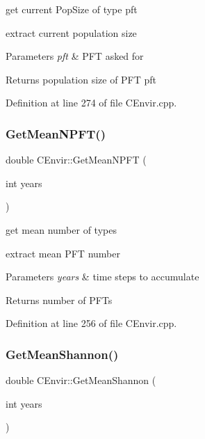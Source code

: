 get current Pop\+Size of type pft 

extract current population size 
\begin{DoxyParams}{Parameters}
{\em pft} & P\+FT asked for \\
\hline
\end{DoxyParams}
\begin{DoxyReturn}{Returns}
population size of P\+FT pft 
\end{DoxyReturn}


Definition at line 274 of file C\+Envir.\+cpp.

\mbox{\label{class_c_envir_ae5d8d6a172ebea8d8ce8d2e1b6c75ee7}} 
\subsubsection{\texorpdfstring{GetMeanNPFT()}{GetMeanNPFT()}}
{\footnotesize\ttfamily double C\+Envir\+::\+Get\+Mean\+N\+P\+FT (\begin{DoxyParamCaption}\item[{int}]{years }\end{DoxyParamCaption})}



get mean number of types 

extract mean P\+FT number 
\begin{DoxyParams}{Parameters}
{\em years} & time steps to accumulate \\
\hline
\end{DoxyParams}
\begin{DoxyReturn}{Returns}
number of P\+F\+Ts 
\end{DoxyReturn}


Definition at line 256 of file C\+Envir.\+cpp.

\mbox{\label{class_c_envir_a4bc4e364b290d8c388bcdb04b352fb51}} 
\subsubsection{\texorpdfstring{GetMeanShannon()}{GetMeanShannon()}}
{\footnotesize\ttfamily double C\+Envir\+::\+Get\+Mean\+Shannon (\begin{DoxyParamCaption}\item[{int}]{years }\end{DoxyParamCaption})}



